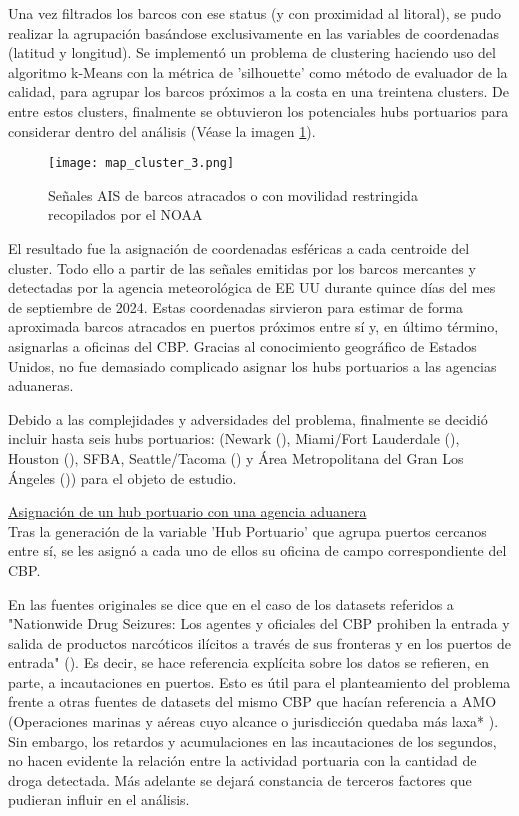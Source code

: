 \documentclass[12pt]{article}
\begin{document}
		Una vez filtrados los barcos con ese status (y con proximidad al litoral), se pudo realizar la agrupación basándose exclusivamente en las variables de coordenadas (latitud y longitud). Se implementó un problema de clustering haciendo uso del algoritmo k-Means con la métrica de 'silhouette' como método de evaluador de la calidad, para agrupar los barcos próximos a la costa en una treintena clusters. De entre estos clusters, finalmente se obtuvieron los potenciales hubs portuarios para considerar dentro del análisis (Véase la imagen \ref{map_cluster_3}).
		
		\begin{figure}[H]
			\caption{\label{map_cluster_3} Señales AIS de barcos atracados o con movilidad restringida recopilados por el NOAA}
			\centering
			\texttt{[image: map\_cluster\_3.png]}
		\end{figure}
		
		 El resultado fue la asignación de coordenadas esféricas a cada centroide del cluster. Todo ello a partir de las señales emitidas por los barcos mercantes y detectadas por la agencia meteorológica de EE UU durante quince días del mes de septiembre de 2024. Estas coordenadas sirvieron para estimar de forma aproximada barcos atracados en puertos próximos entre sí y, en último término, asignarlas a oficinas del CBP. Gracias al conocimiento geográfico de Estados Unidos, no fue demasiado complicado asignar los hubs portuarios a las agencias aduaneras.
		 
		 Debido a las complejidades y adversidades del problema, finalmente se decidió incluir hasta seis hubs portuarios: (Newark (\cite{panynj2025facts}), Miami/Fort Lauderdale (\cite{porteverglades2025stats}), Houston (\cite{porthouston2025teus}), SFBA, Seattle/Tacoma (\cite{nwseaportalliance2025cargo}) y Área Metropolitana del Gran Los Ángeles (\cite{portla2025containerstats})) para el objeto de estudio.
		

		\underline{Asignación de un hub portuario con una agencia aduanera}\\
		Tras la generación de la variable 'Hub Portuario' que agrupa puertos cercanos entre sí, se les asignó a cada uno de ellos su oficina de campo correspondiente del CBP.
		
		En las fuentes originales se dice que en el caso de los datasets referidos a "Nationwide Drug Seizures: Los agentes y oficiales del CBP prohiben la entrada y salida de productos narcóticos ilícitos a través de sus fronteras y en los puertos de entrada" (\cite {cbp2025drugseizures}). Es decir, se hace referencia explícita sobre los datos se refieren, en parte, a incautaciones en puertos. Esto es útil para el planteamiento del problema frente a otras fuentes de datasets del mismo CBP que hacían referencia a AMO (Operaciones marinas y aéreas cuyo alcance o jurisdicción quedaba más laxa* \cite{cbp2025amodrugseizures}). Sin embargo, los retardos y acumulaciones en las incautaciones de los segundos, no hacen evidente la relación entre la actividad portuaria con la cantidad de droga detectada. Más adelante se dejará constancia de terceros factores que pudieran influir en el análisis.
		
\end{document}
